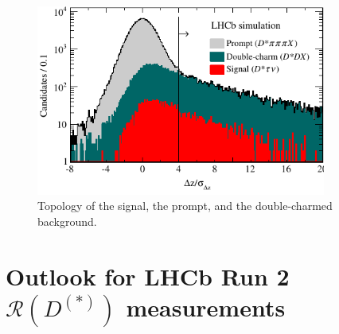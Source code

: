 \documentclass[12pt,letterpaper]{article}
\newcommand{\PRLrule}{
    \bigskip
    \noindent\makebox[\linewidth]{
        \resizebox{0.3333\linewidth}{1pt}{$\blacklozenge$}
    }
    \bigskip
}
\def\RDDst/{\ensuremath{\mathcal{R}(D^{(*)})}}
\begin{document}
\begin{figure}[ht]
    \centering
    \includegraphics[width=0.85\textwidth]{figs/lhcb_3pi_topo.pdf}
    \caption{
        Topology of the signal, the prompt, and the double-charmed background.
    }
    \label{fig:lhcb_3pi_topo}
\end{figure}

\section{Outlook for LHCb Run 2 \RDDst/ measurements}



\PRLrule
\printbibliography
\end{document}
